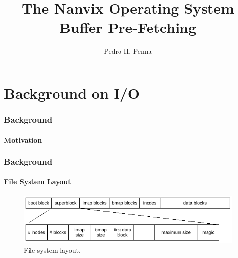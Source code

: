 \documentclass{beamer}
\title[Nanvix]{%
	\textbf{%
		The Nanvix Operating System\\
		\small{Buffer Pre-Fetching}
	}
}
\author[Pedro H. Penna]{%
	Pedro H. Penna%
}
\institute{
	\url{pedrohenriquepenna@gmail.com}
}
\begin{document}
\frame{\titlepage}

\section{Background on I/O}

	\begin{frame}
	\frametitle{Background}
	\framesubtitle{Motivation}
		\begin{itemize}
		\setlength\itemsep{1.5em}
				\begin{itemize}
				\end{itemize}
		\end{itemize}
	\end{frame}

	\begin{frame}
	\frametitle{Background}
	\framesubtitle{File System Layout}
		\begin{figure}
			\centering
			\includegraphics[width=0.9\linewidth]{file-system-layout}
			\caption{File system layout.}
		\end{figure}
	\end{frame}
\end{document}
